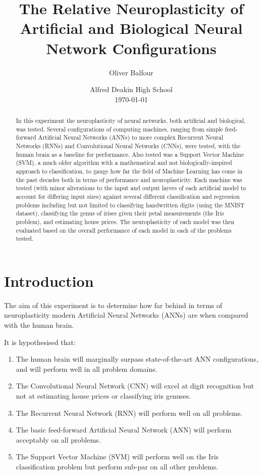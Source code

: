 \documentclass[]{report}
\title{
	The Relative Neuroplasticity of Artificial
	\linebreak
	and Biological Neural Network Configurations
}
\author{Oliver Balfour}
\date{%
	Alfred Deakin High School\\[2ex]%
	\today
}
\begin{document}
\maketitle

\begin{abstract}
	In this experiment the neuroplasticity of neural networks, both artificial and biological, was tested. Several configurations of computing machines, ranging from simple feed-forward Artificial Neural Networks (ANNs) to more complex Recurrent Neural Networks (RNNs) and Convolutional Neural Networks (CNNs), were tested, with the human brain as a baseline for performance. Also tested was a Support Vector Machine (SVM), a much older algorithm with a mathematical and not biologically-inspired approach to classification, to gauge how far the field of Machine Learning has come in the past decades both in terms of performance and neuroplasticity. Each machine was tested (with minor alterations to the input and output layers of each artificial model to account for differing input sizes) against several different classification and regression problems including but not limited to classifying handwritten digits (using the MNIST dataset), classifying the genus of irises given their petal measurements (the Iris problem), and estimating house prices. The neuroplasticity of each model was then evaluated based on the overall performance of each model in each of the problems tested.
\end{abstract}

\tableofcontents
\newpage

\section{Introduction}

The aim of this experiment is to determine how far behind in terms of neuroplasticity modern Artificial Neural Networks (ANNs) are when compared with the human brain.

It is hypothesised that:
\begin{enumerate}
	\item The human brain will marginally surpass state-of-the-art ANN configurations, and will perform well in all problem domains.
	\item The Convolutional Neural Network (CNN) will excel at digit recognition but not at estimating house prices or classifying iris genuses.
	\item The Recurrent Neural Network (RNN) will perform well on all problems.
	\item The basic feed-forward Artificial Neural Network (ANN) will perform acceptably on all problems.
	\item The Support Vector Machine (SVM) will perform well on the Iris classification problem but perform sub-par on all other problems.
\end{enumerate}
\end{document}
